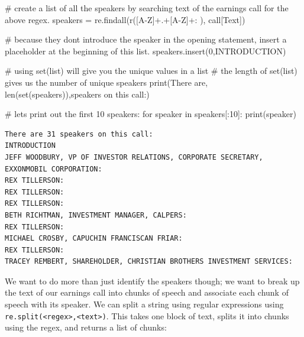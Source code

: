 \documentclass[
  letterpaper,
  DIV=11,
  numbers=noendperiod]{scrreprt}
\newenvironment{Shaded}{\begin{snugshade}}{\end{snugshade}}
\newcommand{\BuiltInTok}[1]{\textcolor[rgb]{0.00,0.23,0.31}{#1}}
\newcommand{\CommentTok}[1]{\textcolor[rgb]{0.37,0.37,0.37}{#1}}
\newcommand{\ControlFlowTok}[1]{\textcolor[rgb]{0.00,0.23,0.31}{#1}}
\newcommand{\DecValTok}[1]{\textcolor[rgb]{0.68,0.00,0.00}{#1}}
\newcommand{\KeywordTok}[1]{\textcolor[rgb]{0.00,0.23,0.31}{#1}}
\newcommand{\NormalTok}[1]{\textcolor[rgb]{0.00,0.23,0.31}{#1}}
\newcommand{\OperatorTok}[1]{\textcolor[rgb]{0.37,0.37,0.37}{#1}}
\newcommand{\StringTok}[1]{\textcolor[rgb]{0.13,0.47,0.30}{#1}}
\newcommand{\VerbatimStringTok}[1]{\textcolor[rgb]{0.13,0.47,0.30}{#1}}
\begin{document}
\begin{Shaded}
\begin{Highlighting}[]
\CommentTok{\# create a list of all the speakers by searching text of the earnings call for the above regex. }
\NormalTok{speakers }\OperatorTok{=}\NormalTok{ re.findall(}\VerbatimStringTok{r\textquotesingle{}([A{-}Z]+.+[A{-}Z]+: )\textquotesingle{}}\NormalTok{, call[}\StringTok{\textquotesingle{}Text\textquotesingle{}}\NormalTok{])}

\CommentTok{\# because they don\textquotesingle{}t introduce the speaker in the opening statement, insert a placeholder at the beginning of this list.}
\NormalTok{speakers.insert(}\DecValTok{0}\NormalTok{,}\StringTok{\textquotesingle{}INTRODUCTION\textquotesingle{}}\NormalTok{)}

\CommentTok{\# using set(list) will give you the unique values in a list}
\CommentTok{\# the length of set(list) gives us the number of unique speakers }
\BuiltInTok{print}\NormalTok{(}\StringTok{\textquotesingle{}There are\textquotesingle{}}\NormalTok{, }\BuiltInTok{len}\NormalTok{(}\BuiltInTok{set}\NormalTok{(speakers)),}\StringTok{\textquotesingle{}speakers on this call:\textquotesingle{}}\NormalTok{)}

\CommentTok{\# let\textquotesingle{}s print out the first 10 speakers: }
\ControlFlowTok{for}\NormalTok{ speaker }\KeywordTok{in}\NormalTok{ speakers[:}\DecValTok{10}\NormalTok{]:}
  \BuiltInTok{print}\NormalTok{(speaker)}
\end{Highlighting}
\end{Shaded}

\begin{verbatim}
There are 31 speakers on this call:
INTRODUCTION
JEFF WOODBURY, VP OF INVESTOR RELATIONS, CORPORATE SECRETARY, EXXONMOBIL CORPORATION: 
REX TILLERSON: 
REX TILLERSON: 
REX TILLERSON: 
BETH RICHTMAN, INVESTMENT MANAGER, CALPERS: 
REX TILLERSON: 
MICHAEL CROSBY, CAPUCHIN FRANCISCAN FRIAR: 
REX TILLERSON: 
TRACEY REMBERT, SHAREHOLDER, CHRISTIAN BROTHERS INVESTMENT SERVICES: 
\end{verbatim}

We want to do more than just identify the speakers though; we want to
break up the text of our earnings call into chunks of speech and
associate each chunk of speech with its speaker. We can split a string
using regular expressions using
\texttt{re.split(\textless{}regex\textgreater{},\textless{}text\textgreater{})}.
This takes one block of text, splits it into chunks using the regex, and
returns a list of chunks:
\end{document}
